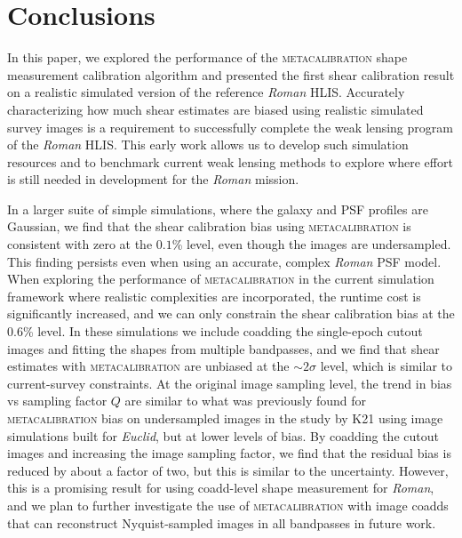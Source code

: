 \documentclass[fleqn,usenatbib]{mnras}
\begin{document}
\section{Conclusions}\label{sec:conclusion}

In this paper, we explored the performance of the \textsc{metacalibration} shape measurement calibration algorithm and presented the first shear calibration result on a realistic simulated version of the reference \emph{Roman} HLIS. Accurately characterizing how much shear estimates are biased using realistic simulated survey images is a requirement to successfully complete the weak lensing program of the \emph{Roman} HLIS. This early work allows us to develop such simulation resources and to benchmark current weak lensing methods to explore where effort is still needed in development for the \emph{Roman} mission. 

In a larger suite of simple simulations, where the galaxy and PSF profiles are Gaussian, we find that the shear calibration bias using \textsc{metacalibration} is consistent with zero at the $0.1$\% level, even though the images are undersampled. This finding persists even when using an accurate, complex \emph{Roman} PSF model. When exploring the performance of \textsc{metacalibration} in the current simulation framework where realistic complexities are incorporated, the runtime cost is significantly increased, and we can only constrain the shear calibration bias at the $0.6$\% level. In these simulations we include coadding the single-epoch cutout images and fitting the shapes from multiple bandpasses, and we find that shear estimates with \textsc{metacalibration} are unbiased at the $\sim 2\sigma$ level, which is similar to current-survey constraints. At the original image sampling level, the trend in bias vs sampling factor $Q$ are similar to what was previously found for \textsc{metacalibration} bias on undersampled images in the study by K21 using image simulations built for \emph{Euclid}, but at lower levels of bias. By coadding the cutout images and increasing the image sampling factor, we find that the residual bias is reduced by about a factor of two, but this is similar to the uncertainty. However, this is a promising result for using coadd-level shape measurement for \emph{Roman}, and we plan to further investigate the use of \textsc{metacalibration} with image coadds that can reconstruct Nyquist-sampled images in all bandpasses in future work.
\end{document}
